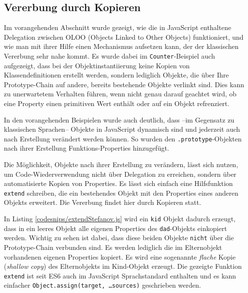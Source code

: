 

\subsection{Vererbung durch Kopieren}

Im vorangehenden Abschnitt wurde gezeigt, wie die in JavaScript enthaltene Delegation zwischen OLOO (Objects Linked to Other Objects) funktioniert, und wie man mit ihrer Hilfe einen Mechanismus aufsetzen kann, der der klassischen Vererbung sehr nahe kommt. Es wurde dabei im \texttt{Counter}-Beispiel auch aufgezeigt, dass bei der Objektinstantiierung keine Kopien von Klassendefinitionen erstellt werden, sondern lediglich Objekte, die über Ihre Prototype-Chain auf andere, bereits bestehende Objekte verlinkt sind. Dies kann zu unerwartetem Verhalten führen, wenn nicht genau darauf geachtet wird, ob eine Property einen primitiven Wert enthält oder auf ein Objekt refrenziert.

In den vorangehenden Beispielen wurde auch deutlich, dass --im Gegensatz zu klassischen Sprachen-- Objekte in JavaScript dynamisch sind und jederzeit auch nach Erstellung verändert werden können. So wurden den \texttt{.prototype}-Objekten nach ihrer Erstellung Funktions-Properties hinzugefügt.

Die Möglichkeit, Objekte nach ihrer Erstellung zu verändern, lässt sich nutzen, um Code-Wiederverwendung nicht über Delegation zu erreichen, sondern über automatisierte Kopien von Properties. Es lässt sich einfach eine Hilfsfunktion \texttt{extend} schreiben, die ein bestehendes Objekt mit den Properties eines anderen Objekts erweitert. Die Vererbung findet hier durch Kopieren statt.

In Listing \ref{codesnips/extendStefanov.js} wird ein \texttt{kid} Objekt dadurch erzeugt, dass in ein leeres Objekt alle eigenen Properties des \texttt{dad}-Objekts einkopiert werden. Wichtig zu sehen ist dabei, dass diese beiden Objekte \texttt{nicht} über die Prototype-Chain verbunden sind. Es werden lediglich die im Elternobjekt vorhandenen eigenen Properties kopiert. Es wird eine sogenannte \emph{flache} Kopie (\emph{shallow copy}) des Elternobjekts im Kind-Objekt erzeugt. Die gezeigte Funktion \texttt{extend} ist seit ES6 auch im JavaScript Sprachstandard enthalten und es kann einfacher \texttt{Object.assign(target, \ldots sources)} geschrieben werden.

